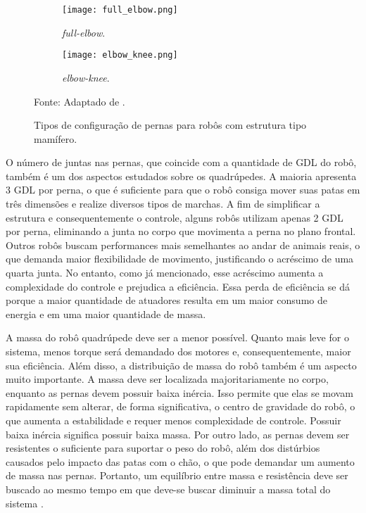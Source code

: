 \documentclass[conference]{IEEEtran}
\begin{document}
\begin{figure}[htbp]
  \centering
  \begin{subfigure}[htbp]{0.24\textwidth}
    \centering
    \texttt{[image: full\_elbow.png]}
    \caption{\textit{full-elbow}.}
    \label{fig:joint_configurations_a}
  \end{subfigure}
  \begin{subfigure}[htbp]{0.24\textwidth}
    \centering
    \texttt{[image: elbow\_knee.png]}
    \caption{\textit{elbow-knee}.}
    \label{fig:joint_configurations_d}
  \end{subfigure}

  \caption{Tipos de configuração de pernas para robôs com estrutura tipo mamífero.}
  Fonte: Adaptado de \cite{Yao2021}.
  \label{fig:joint_configurations}
\end{figure}

O número de juntas nas pernas, que coincide com a quantidade de GDL do robô, também é um dos aspectos estudados sobre os quadrúpedes. A maioria apresenta 3 GDL por perna, o que é suficiente para que o robô consiga mover suas patas em três dimensões e realize diversos tipos de marchas. A fim de simplificar a estrutura e consequentemente o controle, alguns robôs utilizam apenas 2 GDL por perna, eliminando a junta no corpo que movimenta a perna no plano frontal. Outros robôs buscam performances mais semelhantes ao andar de animais reais, o que demanda maior flexibilidade de movimento, justificando o acréscimo de uma quarta junta. No entanto, como já mencionado, esse acréscimo aumenta a complexidade do controle e prejudica a eficiência. Essa perda de eficiência se dá porque a maior quantidade de atuadores resulta em um maior consumo de energia e em uma maior quantidade de massa.

A massa do robô quadrúpede deve ser a menor possível. Quanto mais leve for o sistema, menos torque será demandado dos motores e, consequentemente, maior sua eficiência. Além disso, a distribuição de massa do robô também é um aspecto muito importante. A massa deve ser localizada majoritariamente no corpo, enquanto as pernas devem possuir baixa inércia. Isso permite que elas se movam rapidamente sem alterar, de forma significativa, o centro de gravidade do robô, o que aumenta a estabilidade e requer menos complexidade de controle. Possuir baixa inércia significa possuir baixa massa. Por outro lado, as pernas devem ser resistentes o suficiente para suportar o peso do robô, além dos distúrbios causados pelo impacto das patas com o chão, o que pode demandar um aumento de massa nas pernas. Portanto, um equilíbrio entre massa e resistência deve ser buscado ao mesmo tempo em que deve-se buscar diminuir a massa total do sistema \cite{Zhong2019}.
\end{document}
